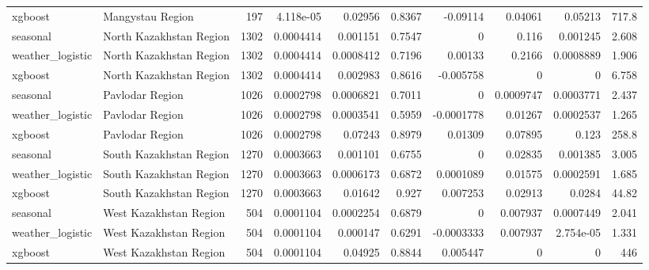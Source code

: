 \begin{table}
\begin{tabular}{llrrrrrrrr}
xgboost & Mangystau Region & 197 & 4.118e-05 & 0.02956 & 0.8367 & -0.09114 & 0.04061 & 0.05213 & 717.8 \\
seasonal & North Kazakhstan Region & 1302 & 0.0004414 & 0.001151 & 0.7547 & 0 & 0.116 & 0.001245 & 2.608 \\
weather_logistic & North Kazakhstan Region & 1302 & 0.0004414 & 0.0008412 & 0.7196 & 0.00133 & 0.2166 & 0.0008889 & 1.906 \\
xgboost & North Kazakhstan Region & 1302 & 0.0004414 & 0.002983 & 0.8616 & -0.005758 & 0 & 0 & 6.758 \\
seasonal & Pavlodar Region & 1026 & 0.0002798 & 0.0006821 & 0.7011 & 0 & 0.0009747 & 0.0003771 & 2.437 \\
weather_logistic & Pavlodar Region & 1026 & 0.0002798 & 0.0003541 & 0.5959 & -0.0001778 & 0.01267 & 0.0002537 & 1.265 \\
xgboost & Pavlodar Region & 1026 & 0.0002798 & 0.07243 & 0.8979 & 0.01309 & 0.07895 & 0.123 & 258.8 \\
seasonal & South Kazakhstan Region & 1270 & 0.0003663 & 0.001101 & 0.6755 & 0 & 0.02835 & 0.001385 & 3.005 \\
weather_logistic & South Kazakhstan Region & 1270 & 0.0003663 & 0.0006173 & 0.6872 & 0.0001089 & 0.01575 & 0.0002591 & 1.685 \\
xgboost & South Kazakhstan Region & 1270 & 0.0003663 & 0.01642 & 0.927 & 0.007253 & 0.02913 & 0.0284 & 44.82 \\
seasonal & West Kazakhstan Region & 504 & 0.0001104 & 0.0002254 & 0.6879 & 0 & 0.007937 & 0.0007449 & 2.041 \\
weather_logistic & West Kazakhstan Region & 504 & 0.0001104 & 0.000147 & 0.6291 & -0.0003333 & 0.007937 & 2.754e-05 & 1.331 \\
xgboost & West Kazakhstan Region & 504 & 0.0001104 & 0.04925 & 0.8844 & 0.005447 & 0 & 0 & 446 \\
\bottomrule
\end{tabular}
\end{table}
